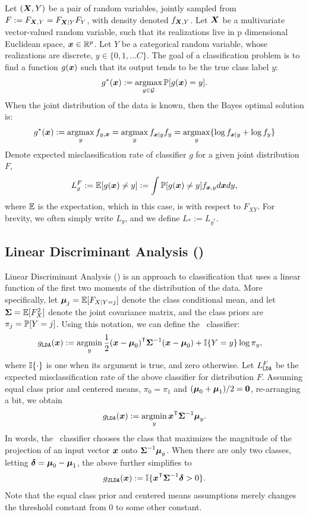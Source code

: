 \documentclass[11pt]{extarticle}
\begin{document}
Let $(\boldsymbol{X},Y)$ be a pair of random variables, jointly sampled from $F :=F_{\boldsymbol{X},Y}=F_{\boldsymbol{X}|Y}F_{Y}$, with density denoted $f_{\boldsymbol{X},Y}$.
Let $\boldsymbol{X}$ be a multivariate vector-valued random variable, such that its realizations live in p dimensional Euclidean space, $\boldsymbol{x} \in \mathbb{R}^p$.  Let $Y$ be a categorical random variable, whose realizations are discrete,  $y \in \{0,1,\ldots C\}$.  The goal of a classification problem is to find a function $g(\boldsymbol{x})$ such that its output tends to be the true class label $y$:
\begin{align*} %
g^*(\bx) := \argmax_{g \in \mc{G}} \PP[g(\bx) = y].
\end{align*}
When the joint distribution of the data is known, then the Bayes optimal solution is:
\begin{align}  \label{eq:R}
g^*(\bx) := \argmax_y f_{y,\bx} = \argmax_y f_{\bx|y}f_y =\argmax_y \{\log f_{\bx|y} + \log f_y \}
\end{align}
Denote expected misclassification rate of classifier $g$ for a given joint distribution $F$,
\begin{align*}
L^F_g := \mathbb{E}[g(\boldsymbol{x}) \neq y] := \int \mathbb{P}[g(\boldsymbol{x}) \neq y] f_{\boldsymbol{x},y} d\boldsymbol{x} dy,
\end{align*}
where $\mathbb{E}$ is the expectation, which in this case, is with respect to $F_{XY}$.
For brevity, we often simply write $L_g$, and we define $L_* := L_{g^*}$.


\subsection{Linear Discriminant Analysis (\Lda)}

Linear Discriminant Analysis (\Lda) is an approach to classification that uses a linear function of the first two moments of the distribution of the data.  More specifically, let $\boldsymbol{\mu}_j=\mathbb{E}[F_{X|Y=j}]$ denote the class conditional mean, and let $\boldsymbol{\Sigma}=\mathbb{E}[F_{X}^2]$ denote the joint covariance matrix, and the class priors are $\pi_j=\mathbb{P}[Y=j]$.   Using this notation, we can define the \Lda~classifier:
\begin{align*}
g_{\Lda}(\bx)&:=\argmin_y \frac{1}{2} (\bx-\bmu_0)\TT \bSig^{-1}(\bx-\bmu_0) + \II\{Y=y\}  \log \pi_y,
\end{align*}
where $\mathbb{I}\{ \cdot\}$ is one when its argument is true, and zero otherwise.
Let $L_{{\texttt{LDA}}}^F$ be the expected misclassification rate of the above classifier for distribution $F$.
%
Assuming equal class prior and centered means,  $\pi_0=\pi_1$ and $(\boldsymbol{\mu}_0+\boldsymbol{\mu}_1)/2=\boldsymbol{0}$, re-arranging a bit, we obtain
\begin{align*}
g_{\Lda}(\bx) :=  \argmin_y \bx\TT \bSig^{-1} \bmu_y.
\end{align*}
In words, the  \Lda~classifier chooses the class that maximizes the magnitude of the projection of an input vector $\boldsymbol{x}$ onto $\boldsymbol{\Sigma}^{-1} \boldsymbol{\mu}_y$.
%
When there are only two classes, letting $\boldsymbol{\delta}=\boldsymbol{\mu}_0-\boldsymbol{\mu}_1$, the above further simplifies to
\begin{align*}
g_{2{\texttt{LDA}}}(\boldsymbol{x}) :=  \mathbb{I}\{ \boldsymbol{x}^{\mathsf{T}} \boldsymbol{\Sigma}^{-1} \boldsymbol{\delta} > 0 \}.
\end{align*}
Note that the equal class prior and centered means assumptions merely changes the threshold constant from $0$ to some other constant.
\end{document}
